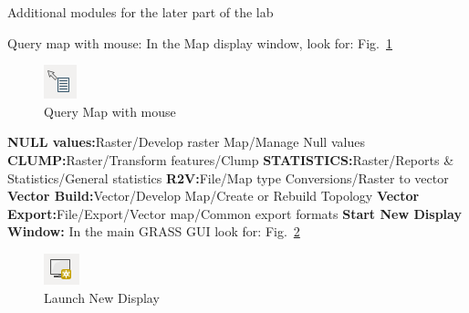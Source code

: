 Additional modules for the later part of the lab

Query map with mouse:
In the Map display window, look for:   Fig.~\ref{fig:grass017}

\begin{figure}[htbp]
   \centering
   \includegraphics[scale=1]{grass017.png}
   \caption{Query Map with mouse}
   \label{fig:grass017}
\end{figure}

\textbf{NULL values:}\newline Raster/Develop raster Map/Manage Null values\newline
\textbf{CLUMP:}\newline Raster/Transform features/Clump\newline
\textbf{STATISTICS:}\newline Raster/Reports \& Statistics/General statistics\newline
\textbf{R2V:}\newline File/Map type Conversions/Raster to vector\newline
\textbf{Vector Build:}\newline Vector/Develop Map/Create or Rebuild Topology\newline
\textbf{Vector Export:}\newline File/Export/Vector map/Common export formats\newline
\textbf{Start New Display Window:}\newline
In the main GRASS GUI look for:    Fig.~\ref{fig:grass018}

\begin{figure}[htbp]
   \centering
   \includegraphics[scale=1]{grass018.png}
   \caption{Launch New Display}
   \label{fig:grass018}
\end{figure}


